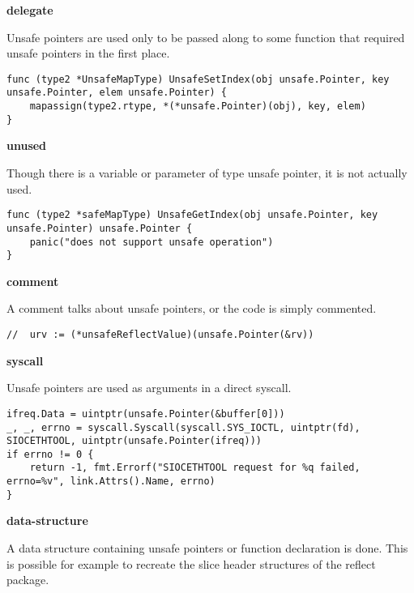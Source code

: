 \textbf{delegate}

Unsafe pointers are used only to be passed along to some function that required unsafe pointers in the first place.

\begin{lstlisting}[language=Golang, label=lst:survey-small-classexample-delegate, caption=Usage class example: delegate]
func (type2 *UnsafeMapType) UnsafeSetIndex(obj unsafe.Pointer, key unsafe.Pointer, elem unsafe.Pointer) {
    mapassign(type2.rtype, *(*unsafe.Pointer)(obj), key, elem)
}
\end{lstlisting}


\textbf{unused}

Though there is a variable or parameter of type unsafe pointer, it is not actually used.

\begin{lstlisting}[language=Golang, label=lst:survey-small-classexample-unused, caption=Usage class example: unused]
func (type2 *safeMapType) UnsafeGetIndex(obj unsafe.Pointer, key unsafe.Pointer) unsafe.Pointer {
    panic("does not support unsafe operation")
}
\end{lstlisting}


\textbf{comment}

A comment talks about unsafe pointers, or the code is simply commented.

\begin{lstlisting}[language=Golang, label=lst:survey-small-classexample-comment, caption=Usage class example: comment]
// 	urv := (*unsafeReflectValue)(unsafe.Pointer(&rv))
\end{lstlisting}


\textbf{syscall}

Unsafe pointers are used as arguments in a direct syscall.

\begin{lstlisting}[language=Golang, label=lst:survey-small-classexample-syscall, caption=Usage class example: syscall]
ifreq.Data = uintptr(unsafe.Pointer(&buffer[0]))
_, _, errno = syscall.Syscall(syscall.SYS_IOCTL, uintptr(fd), SIOCETHTOOL, uintptr(unsafe.Pointer(ifreq)))
if errno != 0 {
    return -1, fmt.Errorf("SIOCETHTOOL request for %q failed, errno=%v", link.Attrs().Name, errno)
}
\end{lstlisting}


\textbf{data-structure}

A data structure containing unsafe pointers or function declaration is done.
This is possible for example to recreate the slice header structures of the reflect package.

